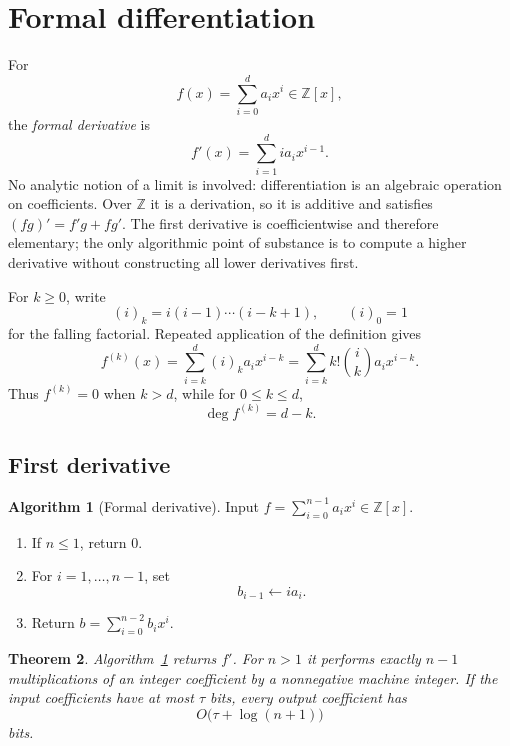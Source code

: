 \documentclass[11pt]{book}
\newtheorem{theorem}{Theorem}[section]
\theoremstyle{definition}
\newtheorem{algorithm}[theorem]{Algorithm}
\newcommand{\ZZ}{\mathbb Z}
\begin{document}
\section{Formal differentiation}\label{sec:formal-differentiation}

For
\[
 f(x)=\sum_{i=0}^{d}a_i x^i\in\ZZ[x],
\]
the \emph{formal derivative} is
\[
 f'(x)=\sum_{i=1}^{d} i a_i x^{i-1}.
\]
No analytic notion of a limit is involved: differentiation is an algebraic
operation on coefficients.  Over $\ZZ$ it is a derivation, so it is additive
and satisfies $(fg)'=f'g+fg'$.  The first derivative is coefficientwise and
therefore elementary; the only algorithmic point of substance is to compute a
higher derivative without constructing all lower derivatives first.

For $k\ge0$, write
\[
 (i)_k=i(i-1)\cdots(i-k+1),\qquad (i)_0=1
\]
for the falling factorial.  Repeated application of the definition gives
\begin{equation}\label{eq:nth-derivative-formula}
 f^{(k)}(x)=\sum_{i=k}^{d}(i)_k a_i x^{i-k}
 =\sum_{i=k}^{d}k!\binom{i}{k}a_i x^{i-k}.
\end{equation}
Thus $f^{(k)}=0$ when $k>d$, while for $0\le k\le d$,
\[
 \deg f^{(k)}=d-k.
\]

\subsection{First derivative}

\begin{algorithm}[Formal derivative]\label{alg:first-derivative}
Input $f=\sum_{i=0}^{n-1}a_i x^i\in\ZZ[x]$.
\begin{enumerate}
 \item If $n\le1$, return $0$.
 \item For $i=1,\ldots,n-1$, set
 \[
    b_{i-1}\leftarrow i a_i.
 \]
 \item Return $b=\sum_{i=0}^{n-2}b_i x^i$.
\end{enumerate}
\end{algorithm}

\begin{theorem}\label{thm:first-derivative}
Algorithm~\ref{alg:first-derivative} returns $f'$.  For $n>1$ it performs
exactly $n-1$ multiplications of an integer coefficient by a nonnegative
machine integer.  If the input coefficients have at most $\tau$ bits, every
output coefficient has
\[
 O\bigl(\tau+\log(n+1)\bigr)
\]
bits.
\end{theorem}
\end{document}
